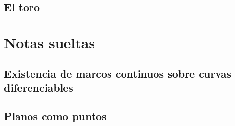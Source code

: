 \documentclass[11pt]{report}
\begin{document}
\section{El toro}
%
%


\chapter{Notas sueltas}

\section{Existencia de marcos continuos sobre curvas diferenciables}
%
%
\section{Planos como puntos}
%

\begin{thebibliography}{9}
%
\end{thebibliography}
\end{document}
